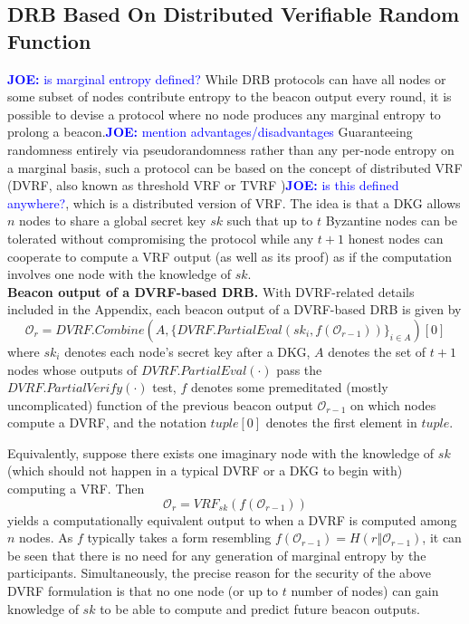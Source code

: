 \documentclass[letterpaper,twocolumn,10pt]{article}
\theoremstyle{definition}
\theoremstyle{remark}
\newcommand{\joenote}[1]{\textcolor{blue}{\textbf{JOE:} #1}}
\begin{document}
\subsection{DRB Based On Distributed Verifiable Random Function}
\joenote{is marginal entropy defined?}
While DRB protocols can have all nodes or some subset of nodes contribute entropy to the beacon output every round, it is possible to devise a protocol where no node produces any marginal entropy to prolong a beacon.\joenote{mention advantages/disadvantages} Guaranteeing randomness entirely via pseudorandomness rather than any per-node entropy on a marginal basis, such a protocol can be based on the concept of distributed VRF \cite{hanke2018dfinity,galindo2020fully} (DVRF, also known as threshold VRF or TVRF \cite{cascudomt})\joenote{is this defined anywhere?}, which is a distributed version of VRF. The idea is that a DKG allows $n$ nodes to share a global secret key $sk$ such that up to $t$ Byzantine nodes can be tolerated without compromising the protocol while any $t + 1$ honest nodes can cooperate to compute a VRF output (as well as its proof) as if the computation involves one node with the knowledge of $sk$.\\

\noindent\textbf{Beacon output of a DVRF-based DRB.} With DVRF-related details included in the Appendix, each beacon output of a DVRF-based DRB is given by
\begingroup\makeatletter\def\f@size{8}\check@mathfonts
\[
\mathcal{O}_r = DVRF.Combine(A, \{DVRF.PartialEval(sk_i, f(\mathcal{O}_{r - 1}))\}_{i \in A})[0]
\]\endgroup
where $sk_i$ denotes each node's secret key after a DKG, $A$ denotes the set of $t + 1$ nodes whose outputs of $DVRF.PartialEval(\cdot)$ pass the $DVRF.PartialVerify(\cdot)$ test, $f$ denotes some premeditated (mostly uncomplicated) function of the previous beacon output $\mathcal{O}_{r - 1}$ on which nodes compute a DVRF, and the notation $tuple[0]$ denotes the first element in $tuple$.

Equivalently, suppose there exists one imaginary node with the knowledge of $sk$ (which should not happen in a typical DVRF or a DKG to begin with) computing a VRF. Then
\[
\mathcal{O}_r = VRF_{sk}(f(\mathcal{O}_{r - 1}))
\]
yields a computationally equivalent output to when a DVRF is computed among $n$ nodes. As $f$ typically takes a form resembling $f(\mathcal{O}_{r - 1}) = H(r \mathbin\Vert \mathcal{O}_{r - 1})$, it can be seen that there is no need for any generation of marginal entropy by the participants. Simultaneously, the precise reason for the security of the above DVRF formulation is that no one node (or up to $t$ number of nodes) can gain knowledge of $sk$ to be able to compute and predict future beacon outputs.\\
\end{document}
